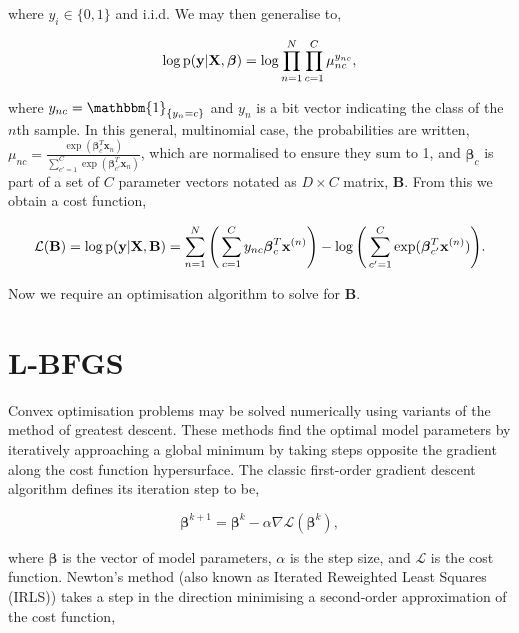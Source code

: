 where $y_i \in \{0, 1\}$ and i.i.d. We may then generalise to,

\begin{equation}
\begin{aligned}
\log\text{p}(\mathbf{y}|\mathbf{X}, \boldsymbol\beta) = \log \prod_{n = 1}^N \prod_{c = 1}^C \mu_{nc}^{y_{nc}},
\end{aligned}
\label{eq:multinomial}
\end{equation}

where $y_{nc} = \mathbbm{1}_{\{y_n = c\}}$ and $y_n$ is a bit vector indicating the class of the $n$th sample. In this general, multinomial case, the probabilities are written, $\mu_{nc} = \frac{\exp(\boldsymbol\beta_c^T\mathbf{x}_n)}{\sum_{c' = 1}^C \exp(\boldsymbol\beta_{c'}^T\mathbf{x}_n)}$, which are normalised to ensure they sum to 1, and $\boldsymbol\beta_c$ is part of a set of $C$ parameter vectors notated as $D \times C$ matrix, $\mathbf{B}$. From this we obtain a cost function,

\begin{equation}
\mathcal{L}(\mathbf{B}) = 
\log\text{p}(\mathbf{y}|\mathbf{X}, \mathbf{B}) = \sum_{n=1}^N  \Bigg( \sum_{c = 1}^C y_{nc}\boldsymbol\beta_c^T \mathbf{x}^{(n)} \Bigg) - \log \Bigg( \sum_{c' = 1}^C \exp(\boldsymbol\beta_{c'}^T\mathbf{x}^{(n)})\Bigg).
\label{eq:logisticcost}
\end{equation}

Now we require an optimisation algorithm to solve for $\mathbf{B}$.

\section{L-BFGS}
\label{sec:lbfgs}

Convex optimisation problems may be solved numerically using variants of the method of greatest descent. These methods find the optimal model parameters by iteratively approaching a global minimum by taking steps opposite the gradient along the cost function hypersurface. The classic first-order gradient descent algorithm defines its iteration step to be,

\begin{equation}
\boldsymbol\beta^{k+1} = \boldsymbol\beta^{k} - \alpha\nabla\mathcal{L}(\boldsymbol\beta^{k}),
\label{eq:gd}
\end{equation}

where $\boldsymbol\beta$ is the vector of model parameters, $\alpha$ is the step size, and $\mathcal{L}$ is the cost function. Newton's method (also known as Iterated Reweighted Least Squares (IRLS)) takes a step in the direction minimising a second-order approximation of the cost function,

